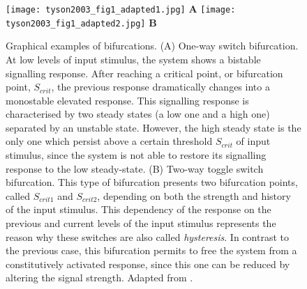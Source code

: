 \begin{figure}[tb]
	\begin{center}
		\texttt{[image: tyson2003\_fig1\_adapted1.jpg]}
		\textbf{A}
		\hfill
		\texttt{[image: tyson2003\_fig1\_adapted2.jpg]}
		\textbf{B}
		\hfill
		\caption[Graphical examples of bifurcations.]{Graphical examples of bifurcations. (A) One-way switch bifurcation. At low levels of input stimulus, the system shows a bistable signalling response. After reaching a critical point, or bifurcation point, $S_{crit}$, the previous response dramatically changes into a monostable elevated response. This signalling response is characterised by two steady states (a low one and a high one) separated by an unstable state. However, the high steady state is the only one which persist above a certain threshold $S_{crit}$ of input stimulus, since the system is not able to restore its signalling response to the low steady-state. (B) Two-way toggle switch bifurcation. This type of bifurcation presents two bifurcation points, called $S_{crit1}$ and $S_{crit2}$, depending on both the strength and history of the input stimulus. This dependency of the response on the previous and current levels of the input stimulus represents the reason why these switches are also called \emph{
hysteresis}. In contrast to the previous case, this bifurcation permits to free the system from a constitutively activated response, since this one can be reduced by altering the signal strength. Adapted from \citep[Fig. 1]{Tyson2003}.}
		\label{fig:tyson2003_fig1_adapted}
	\end{center}
\end{figure}


\clearpage



